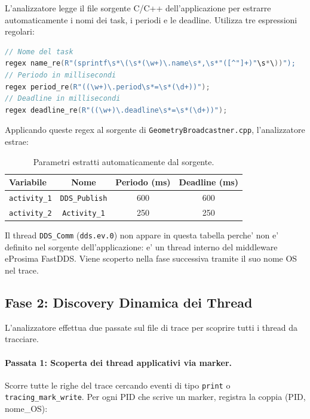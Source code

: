 L'analizzatore legge il file sorgente C/C++ dell'applicazione per estrarre
automaticamente i nomi dei task, i periodi e le deadline. Utilizza tre
espressioni regolari:

\begin{lstlisting}[language=C++, caption={Regex per estrazione parametri dal sorgente.}, label={lst:regex}]
// Nome del task
regex name_re(R"(sprintf\s*\(\s*(\w+)\.name\s*,\s*"([^"]+)"\s*\))");
// Periodo in millisecondi
regex period_re(R"((\w+)\.period\s*=\s*(\d+))");
// Deadline in millisecondi
regex deadline_re(R"((\w+)\.deadline\s*=\s*(\d+))");
\end{lstlisting}

Applicando queste regex al sorgente di \texttt{GeometryBroadcastner.cpp},
l'analizzatore estrae:

\begin{table}[htbp]
\centering
\caption{Parametri estratti automaticamente dal sorgente.}
\label{tab:params}
\begin{tabular}{lccc}
\toprule
\textbf{Variabile} & \textbf{Nome} & \textbf{Periodo (ms)} & \textbf{Deadline (ms)} \\
\midrule
\texttt{activity\_1} & \texttt{DDS\_Publish} & 600 & 600 \\
\texttt{activity\_2} & \texttt{Activity\_1}  & 250 & 250 \\
\bottomrule
\end{tabular}
\end{table}

Il thread \texttt{DDS\_Comm} (\texttt{dds.ev.0}) non appare in questa
tabella perche' non e' definito nel sorgente dell'applicazione: e' un
thread interno del middleware eProsima FastDDS. Viene scoperto nella fase
successiva tramite il suo nome OS nel trace.

\subsection{Fase 2: Discovery Dinamica dei Thread}
\label{subsec:discovery}

L'analizzatore effettua due passate sul file di trace per scoprire
tutti i thread da tracciare.

\paragraph{Passata 1: Scoperta dei thread applicativi via marker.}
Scorre tutte le righe del trace cercando eventi di tipo \texttt{print}
o \texttt{tracing\_mark\_write}. Per ogni PID che scrive un marker,
registra la coppia (PID, nome\_OS):

